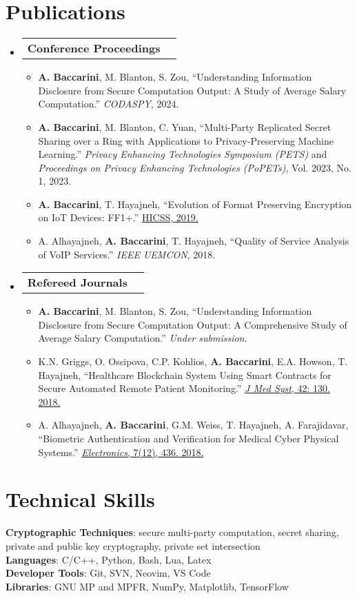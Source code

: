 \documentclass[letterpaper,11pt]{article}
\makeatletter
\newcommand{\resumeItem}[1]{
    \item\small{
        {#1 \vspace{-2pt}}
    }
}
\newcommand{\resumeProjectHeading}[2]{
    \item
    \begin{tabular*}{0.97\textwidth}{l@{\extracolsep{\fill}}r}
        \small#1 & #2 \\
    \end{tabular*}\vspace{-7pt}
}
\newcommand{\resumeSubHeadingListStart}{\begin{itemize}[leftmargin=0.15in, label={}]}
\newcommand{\resumeSubHeadingListEnd}{\end{itemize}}
\newcommand{\resumeItemListStart}{\begin{itemize}}
\newcommand{\resumeItemListEnd}{\end{itemize}\vspace{-5pt}}
\makeatother
\begin{document}
\section{Publications}
\resumeSubHeadingListStart
\resumeProjectHeading
{\textbf{Conference Proceedings}}{}
\resumeItemListStart
\resumeItem{\textbf{A. Baccarini}, M. Blanton, S. Zou, ``Understanding Information Disclosure from Secure Computation Output: A Study of Average Salary Computation.'' \emph{CODASPY}, 2024.}
\resumeItem{\textbf{A. Baccarini}, M. Blanton, C. Yuan, ``Multi-Party Replicated Secret Sharing over a Ring with Applications to Privacy-Preserving Machine Learning.'' \emph{Privacy Enhancing Technologies Symposium (PETS)} and \emph{Proceedings on Privacy Enhancing Technologies (PoPETs)}, Vol. 2023, No. 1, 2023. }
\resumeItem{\textbf{A. Baccarini}, T. Hayajneh, ``Evolution of Format Preserving Encryption on IoT Devices: FF1+.'' \href{https://scholarspace.manoa.hawaii.edu/handle/10125/59603}{HICSS, 2019.}}
\resumeItem{A. Alhayajneh, \textbf{A. Baccarini}, T. Hayajneh,  ``Quality of Service Analysis of VoIP Services.''  \emph{IEEE UEMCON}, 2018.}
\resumeItemListEnd
\resumeProjectHeading
{\textbf{Refereed Journals}}{}
\resumeItemListStart
\resumeItem{\textbf{A. Baccarini}, M. Blanton, S. Zou,  ``Understanding Information Disclosure from Secure Computation Output: A Comprehensive Study of Average Salary Computation.''  \emph{Under submission}.}
\resumeItem{K.N. Griggs, O. Ossipova, C.P. Kohlios, \textbf{A. Baccarini}, E.A. Howson, T. Hayajneh, ``Healthcare Blockchain System Using Smart Contracts for Secure Automated Remote Patient Monitoring.'' \href{https://link.springer.com/article/10.1007/s10916-018-0982-x}{\emph{J Med Syst}, 42: 130. 2018.} }
\resumeItem{A. Alhayajneh, \textbf{A. Baccarini}, G.M. Weiss, T. Hayajneh, A.  Farajidavar,   ``Biometric Authentication and Verification for Medical Cyber Physical Systems.'' \href{https://www.mdpi.com/2079-9292/7/12/436}{\emph{Electronics}, 7(12), 436. 2018.}}
\resumeItemListEnd
\resumeSubHeadingListEnd




%
\section{Technical Skills}
\begin{itemize}[leftmargin=0.15in, label={}]
    \small{\item{
          \textbf{Cryptographic Techniques}{: secure multi-party computation, secret sharing, private and public key cryptography, private set intersection} \\
          \textbf{Languages}{: C/C++, Python, Bash, Lua, Latex} \\
          \textbf{Developer Tools}{: Git, SVN, Neovim, VS Code } \\
          \textbf{Libraries}{:  GNU MP and MPFR, NumPy, Matplotlib, TensorFlow}
          }}
\end{itemize}


\end{document}
